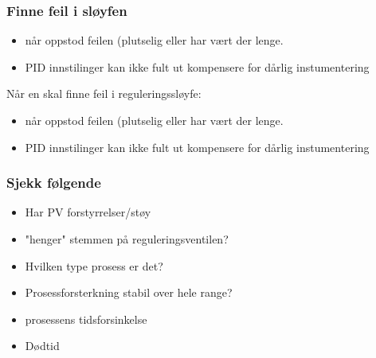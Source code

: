\documentclass[aspectratio=169,xcolor=dvipsnames]{beamer}
\begin{document}
	\begin{frame}
		\frametitle{Finne feil i sløyfen}
		\begin{itemize}
			\item når oppstod feilen (plutselig eller har vært der lenge. 
			\item PID innstilinger kan ikke fult ut kompensere for dårlig instumentering
		\end{itemize}

		Når en skal finne feil i reguleringssløyfe: 
		\begin{itemize}
			\item når oppstod feilen (plutselig eller har vært der lenge. 
			\item PID innstilinger kan ikke fult ut kompensere for dårlig instumentering
		\end{itemize}

		
	\end{frame}

\begin{frame}
	\frametitle{Sjekk følgende}
	\begin{itemize}
		\item Har PV forstyrrelser/støy
		\item "henger" stemmen på reguleringsventilen?
		\item Hvilken type prosess er det?
		\item Prosessforsterkning stabil over hele range?
		\item prosessens tidsforsinkelse
		\item Dødtid 
	\end{itemize}

	
\end{frame}
\end{document}
